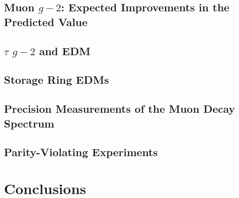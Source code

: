\section{Muon $g-2$:  Expected Improvements in the Predicted Value}
\vskip -12pt


\section{$\tau$ $g-2$ and EDM}
\vskip -12pt


\section{Storage Ring EDMs}
\vskip -12pt


\section{Precision Measurements of the Muon Decay Spectrum}
\vskip -12pt


\section{Parity-Violating Experiments}\label{sec:cl:pve}
\vskip -12pt


\chapter{Conclusions}\label{sec:cl:gm2edmdisc}
\vskip 6pt





